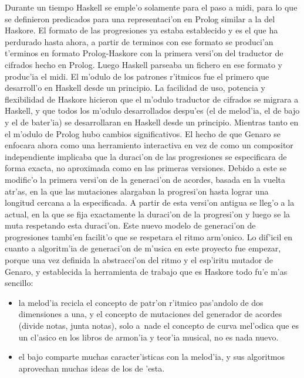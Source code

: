 \documentclass[a4paper,11pt]{article}
\begin{document}
\begin{itemize}
\newline
Durante un tiempo Haskell se emple'o solamente para el paso a midi, para lo que se definieron predicados para una representaci'on en Prolog similar a la del Haskore. El formato de las progresiones ya estaba establecido y es el que ha perdurado hasta ahora, a partir de terminos con ese formato se produci'an t'erminos en formato Prolog-Haskore con la primera versi'on del traductor de cifrados hecho en Prolog. Luego Haskell parseaba un fichero en ese formato y produc'ia el midi. El m'odulo de los patrones r'itmicos fue el primero que desarroll'o en Haskell desde un principio. La facilidad de uso, potencia y flexibilidad de Haskore hicieron que el m'odulo traductor de cifrados se migrara a Haskell, y que todos los m'odulo desarrollados despu'es (el de melod'ia, el de bajo y el de bater'ia) se desarrollaran en Haskell desde un principio.
\newline
Mientras tanto en el m'odulo de Prolog hubo cambios significativos. El hecho de que Genaro se enfocara ahora como una herramiento interactiva en vez de como un compositor independiente implicaba que la duraci'on de las progresiones se especificara de forma exacta, no aproximada como en las primeras versiones. Debido a este se modific'o la primera versi'on de la generaci'on de acordes, basada en la vuelta atr'as, en la que las mutaciones alargaban la progresi'on hasta lograr una longitud cercana a la especificada. A partir de esta versi'on antigua se lleg'o a la actual, en la que se fija exactamente la duraci'on de la progresi'on y luego se la muta respetando esta duraci'on. Este nuevo modelo de generaci'on de progresiones tambi'en facilit'o que se respetara el ritmo arm'onico.
\newline
Lo dif'icil en cuanto a algoritm'ia de generaci'on de m'usica en este proyecto fue empezar, porque una vez definida la abstracci'on del ritmo y el esp'iritu mutador de Genaro, y establecida la herramienta de trabajo que es Haskore todo fu'e m'as sencillo:
                \begin{itemize}
                \item la melod'ia recicla el concepto de patr'on r'itmico pas'andolo de dos dimensiones a una, y el concepto de mutaciones del generador de acordes (divide notas, junta notas), solo a~nade el concepto de curva mel'odica que es un cl'asico en los libros de armon'ia y teor'ia musical, no es nada nuevo. 
                \item el bajo comparte muchas caracter'isticas con la melod'ia, y sus algoritmos aprovechan muchas ideas de los de 'esta.

\end{itemize}
\end{itemize}
\end{document}
